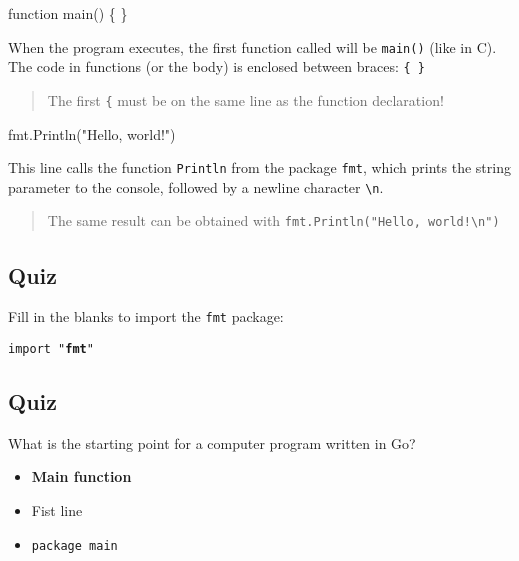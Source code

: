 \documentclass[]{book}
\newenvironment{Shaded}{\begin{snugshade}}{\end{snugshade}}
\newcommand{\NormalTok}[1]{#1}
\newcommand{\StringTok}[1]{\textcolor[rgb]{0.31,0.60,0.02}{#1}}
\providecommand{\tightlist}{%
  \setlength{\itemsep}{0pt}\setlength{\parskip}{0pt}}
\begin{document}
\begin{Shaded}
\begin{Highlighting}[]
\NormalTok{function main() \{ \}}
\end{Highlighting}
\end{Shaded}

When the program executes, the first function called will be \texttt{main()} (like in C). The code in functions (or the body) is enclosed between braces: \texttt{\{\ \}}

\begin{quote}
The first \texttt{\{} must be on the same line as the function declaration!
\end{quote}

\begin{Shaded}
\begin{Highlighting}[]
\NormalTok{    fmt.Println(}\StringTok{"Hello, world!"}\NormalTok{)}
\end{Highlighting}
\end{Shaded}

This line calls the function \texttt{Println} from the package \texttt{fmt}, which prints the string parameter to the console, followed by a newline character \texttt{\textbackslash{}n}.

\begin{quote}
The same result can be obtained with \texttt{fmt.Println("Hello,\ world!\textbackslash{}n")}
\end{quote}

\hypertarget{quiz-1}{%
\subsection{Quiz}\label{quiz-1}}

Fill in the blanks to import the \texttt{fmt} package:

\texttt{import\ "}\textbf{\texttt{fmt}}\texttt{"}

\hypertarget{quiz-2}{%
\subsection{Quiz}\label{quiz-2}}

What is the starting point for a computer program written in Go?

\begin{itemize}
\tightlist
\item
  \textbf{Main function}
\item
  Fist line
\item
  \texttt{package\ main}
\end{itemize}
\end{document}
